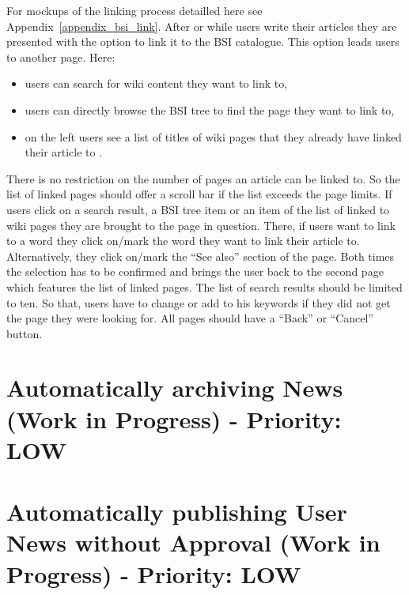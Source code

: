 \begin{tcolorbox}[breakable,colback=red!12,colframe=red!40!black,title=UPDATE 15/11/2017]
    For mockups of the linking process detailled here see Appendix~\ref{appendix_bsi_link}.
    After or while users write their articles they are presented with the option to link it to the BSI catalogue.
    This option leads users to another page. Here:
    \begin{itemize}

        \item users can search for wiki content they want to link to,
        \item users can directly browse the BSI tree to find the page they want to link to,
        \item on the left  users see a list of titles of wiki pages that they already have linked their article to
            .
    \end{itemize}
    There is no restriction on the number of pages an article can be linked to.
    So the list of linked pages should offer a scroll bar if the list exceeds the page limits.
    If users click on a search result, a BSI tree item or an item of the list of linked to wiki pages they are brought to the page in question.
    There, if users want to link to a word they click on/mark the word they want to link their article to.
    Alternatively, they click on/mark the ``See also'' section of the page.
    Both times the selection has to be confirmed and brings the user back to the second page which features the list of linked pages.
    The list of search results should be limited to ten.
    So that, users have to change or add to his keywords if they did not get the page they were looking for.
    All pages should have a ``Back'' or ``Cancel'' button.  
\end{tcolorbox}

\section{Automatically archiving News (Work in Progress) - Priority: LOW}



\section{Automatically publishing User News without Approval (Work in Progress) - Priority: LOW}



